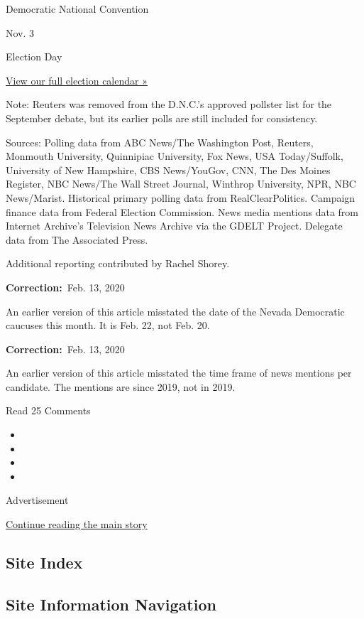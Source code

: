 Democratic National Convention

Nov. 3

Election Day

\href{https://www.nytimes.com/interactive/2019/us/elections/2020-presidential-election-calendar.html}{View
our full election calendar »}

Note: Reuters was removed from the D.N.C.'s approved pollster list for
the September debate, but its earlier polls are still included for
consistency.

Sources: Polling data from ABC News/The Washington Post, Reuters,
Monmouth University, Quinnipiac University, Fox News, USA Today/Suffolk,
University of New Hampshire, CBS News/YouGov, CNN, The Des Moines
Register, NBC News/The Wall Street Journal, Winthrop University, NPR,
NBC News/Marist. Historical primary polling data from RealClearPolitics.
Campaign finance data from Federal Election Commission. News media
mentions data from Internet Archive's Television News Archive via the
GDELT Project. Delegate data from The Associated Press.

Additional reporting contributed by Rachel Shorey.

\textbf{Correction:}~Feb. 13, 2020

An earlier version of this article misstated the date of the Nevada
Democratic caucuses this month. It is Feb. 22, not Feb. 20.

\textbf{Correction:}~Feb. 13, 2020

An earlier version of this article misstated the time frame of news
mentions per candidate. The mentions are since 2019, not in 2019.

Read 25 Comments

\begin{itemize}
\item
\item
\item
\item
\end{itemize}

Advertisement

\protect\hyperlink{after-bottom}{Continue reading the main story}

\hypertarget{site-index}{%
\subsection{Site Index}\label{site-index}}

\hypertarget{site-information-navigation}{%
\subsection{Site Information
Navigation}\label{site-information-navigation}}

